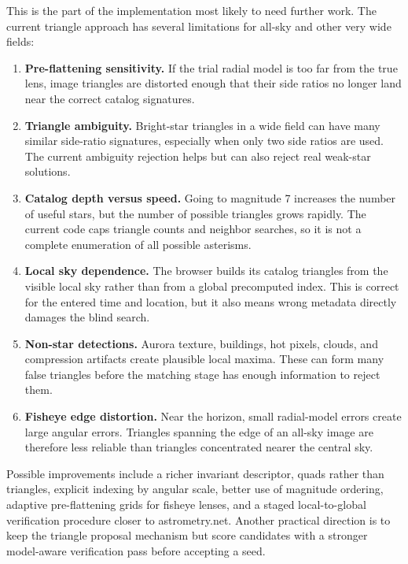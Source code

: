 \documentclass[11pt]{article}
\begin{document}
This is the part of the implementation most likely to need further work. The
current triangle approach has several limitations for all-sky and other very
wide fields:
\begin{enumerate}
  \item \textbf{Pre-flattening sensitivity.} If the trial radial model is too
        far from the true lens, image triangles are distorted enough that their
        side ratios no longer land near the correct catalog signatures.
  \item \textbf{Triangle ambiguity.} Bright-star triangles in a wide field can
        have many similar side-ratio signatures, especially when only two side
        ratios are used. The current ambiguity rejection helps but can also
        reject real weak-star solutions.
  \item \textbf{Catalog depth versus speed.} Going to magnitude 7 increases the
        number of useful stars, but the number of possible triangles grows
        rapidly. The current code caps triangle counts and neighbor searches,
        so it is not a complete enumeration of all possible asterisms.
  \item \textbf{Local sky dependence.} The browser builds its catalog triangles
        from the visible local sky rather than from a global precomputed index.
        This is correct for the entered time and location, but it also means
        wrong metadata directly damages the blind search.
  \item \textbf{Non-star detections.} Aurora texture, buildings, hot pixels,
        clouds, and compression artifacts create plausible local maxima. These
        can form many false triangles before the matching stage has enough
        information to reject them.
  \item \textbf{Fisheye edge distortion.} Near the horizon, small radial-model
        errors create large angular errors. Triangles spanning the edge of an
        all-sky image are therefore less reliable than triangles concentrated
        nearer the central sky.
\end{enumerate}

Possible improvements include a richer invariant descriptor, quads rather than
triangles, explicit indexing by angular scale, better use of magnitude ordering,
adaptive pre-flattening grids for fisheye lenses, and a staged local-to-global
verification procedure closer to astrometry.net. Another practical direction is
to keep the triangle proposal mechanism but score candidates with a stronger
model-aware verification pass before accepting a seed.
\end{document}
